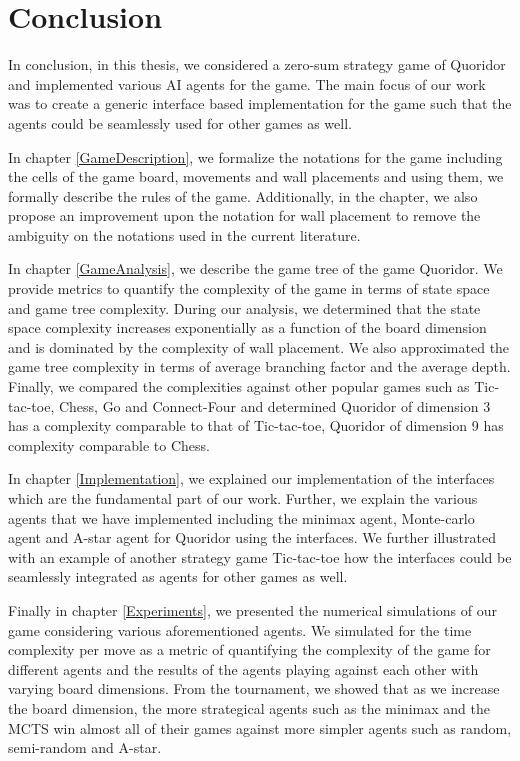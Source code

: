 \chapter{Conclusion}\label{Conclusion}

In conclusion, in this thesis, we considered a zero-sum strategy game of Quoridor and implemented various AI agents for the game. The main focus of our work was to create a generic interface based implementation for the game such that the agents could be seamlessly used for other games as well.

In chapter \ref{GameDescription}, we formalize the notations for the game including the cells of the game board, movements and wall placements and using them, we formally describe the rules of the game. Additionally, in the chapter, we also propose an improvement upon the notation for wall placement to remove the ambiguity on the notations used in the current literature.

In chapter \ref{GameAnalysis}, we describe the game tree of the game Quoridor. We provide metrics to quantify the complexity of the game in terms of state space and game tree complexity. During our analysis, we determined that the state space complexity increases exponentially as a function of the board dimension and is dominated by the complexity of wall placement. We also approximated the game tree complexity in terms of average branching factor and the average depth. Finally, we compared the complexities against other popular games such as Tic-tac-toe, Chess, Go and Connect-Four and determined Quoridor of dimension 3 has a complexity comparable to that of Tic-tac-toe, Quoridor of dimension 9 has complexity comparable to Chess.

In chapter \ref{Implementation}, we explained our implementation of the interfaces which are the fundamental part of our work. Further, we explain the various agents that we have implemented including the minimax agent, Monte-carlo agent and A-star agent for Quoridor using the interfaces. We further illustrated with an example of another strategy game Tic-tac-toe how the interfaces could be seamlessly integrated as agents for other games as well. 

Finally in chapter \ref{Experiments}, we presented the numerical simulations of our game considering various aforementioned agents. We simulated for the time complexity per move as a metric of quantifying the complexity of the game for different agents and the results of the agents playing against each other with varying board dimensions. From the tournament, we showed that as we increase the board dimension, the more strategical agents such as the minimax and the MCTS win almost all of their games against more simpler agents such as random, semi-random and A-star.
